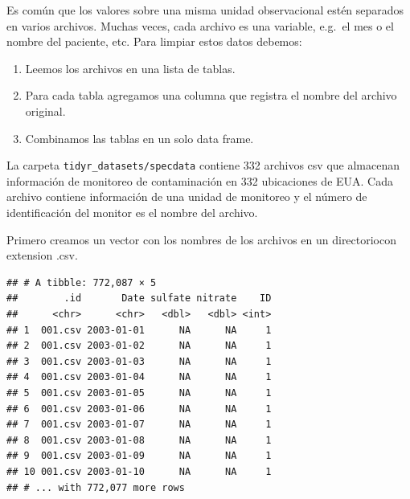 \documentclass[]{article}
\newenvironment{Shaded}{\begin{snugshade}}{\end{snugshade}}
\newcommand{\KeywordTok}[1]{\textcolor[rgb]{0.13,0.29,0.53}{\textbf{#1}}}
\newcommand{\DataTypeTok}[1]{\textcolor[rgb]{0.13,0.29,0.53}{#1}}
\newcommand{\CharTok}[1]{\textcolor[rgb]{0.31,0.60,0.02}{#1}}
\newcommand{\StringTok}[1]{\textcolor[rgb]{0.31,0.60,0.02}{#1}}
\newcommand{\OtherTok}[1]{\textcolor[rgb]{0.56,0.35,0.01}{#1}}
\newcommand{\NormalTok}[1]{#1}
\providecommand{\tightlist}{%
  \setlength{\itemsep}{0pt}\setlength{\parskip}{0pt}}
\begin{document}
Es común que los valores sobre una misma unidad observacional estén
separados en varios archivos. Muchas veces, cada archivo es una
variable, e.g.~el mes o el nombre del paciente, etc. Para limpiar estos
datos debemos:

\begin{enumerate}
\def\labelenumi{\arabic{enumi}.}
\tightlist
\item
  Leemos los archivos en una lista de tablas.
\item
  Para cada tabla agregamos una columna que registra el nombre del
  archivo original.
\item
  Combinamos las tablas en un solo data frame.
\end{enumerate}

La carpeta \texttt{tidyr\_datasets/specdata} contiene 332 archivos csv
que almacenan información de monitoreo de contaminación en 332
ubicaciones de EUA. Cada archivo contiene información de una unidad de
monitoreo y el número de identificación del monitor es el nombre del
archivo.

Primero creamos un vector con los nombres de los archivos en un
directoriocon extension .csv.

\begin{Shaded}
\end{Shaded}

\begin{verbatim}
## # A tibble: 772,087 × 5
##        .id       Date sulfate nitrate    ID
##      <chr>      <chr>   <dbl>   <dbl> <int>
## 1  001.csv 2003-01-01      NA      NA     1
## 2  001.csv 2003-01-02      NA      NA     1
## 3  001.csv 2003-01-03      NA      NA     1
## 4  001.csv 2003-01-04      NA      NA     1
## 5  001.csv 2003-01-05      NA      NA     1
## 6  001.csv 2003-01-06      NA      NA     1
## 7  001.csv 2003-01-07      NA      NA     1
## 8  001.csv 2003-01-08      NA      NA     1
## 9  001.csv 2003-01-09      NA      NA     1
## 10 001.csv 2003-01-10      NA      NA     1
## # ... with 772,077 more rows
\end{verbatim}
\end{document}

